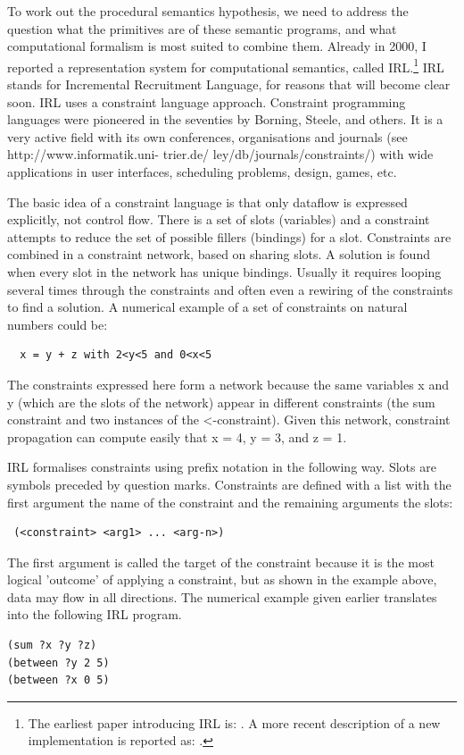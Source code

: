 To work out the procedural semantics hypothesis, we need to address the question what the primitives are of 
these semantic programs, and what computational formalism is most suited to combine them. Already in 2000, I reported
a representation system for computational semantics, called IRL.\footnote{
The earliest paper introducing IRL is: \cite{Steels:2000}. 
A more recent description of a new implementation is reported as: \cite{Spranger:2012}.}
IRL stands for Incremental Recruitment Language, for reasons that will become clear soon. 
IRL uses a constraint language approach. Constraint programming languages were pioneered in the  
seventies by Borning, Steele, and others. It is a very active field with its own conferences, 
organisations and journals (see http://www.informatik.uni- trier.de/ ley/db/journals/constraints/) 
with wide applications in user interfaces, scheduling problems, design, games, etc. 

The basic idea of a constraint language is that only dataflow is expressed explicitly, not control flow. 
There is a set of slots (variables) and a constraint attempts to reduce the set of possible 
fillers (bindings) for a slot. Constraints are combined in 
a constraint network, based on sharing slots. A solution is found when every slot in the network has unique bindings. 
Usually it requires looping several times through the constraints and often even a rewiring of the constraints to 
find a solution. A numerical example of a set of constraints on natural numbers could be:
\begin{verbatim}
  x = y + z with 2<y<5 and 0<x<5
\end{verbatim}
The constraints expressed here form a network because the same variables x and y (which are the slots of the 
network) appear in different constraints (the sum constraint and two instances of the <-constraint). 
Given this network, constraint propagation can compute easily that x = 4, y = 3, and z = 1. 

IRL formalises constraints using prefix notation in the following way. Slots are symbols preceded 
by question marks. Constraints are defined with a list with the first argument the name of the constraint and 
the remaining arguments the slots: 
\begin{verbatim}
 (<constraint> <arg1> ... <arg-n>)
\end{verbatim}
The first argument is called the target of the constraint because it is the most logical 'outcome' 
of applying a constraint, but as shown in the example above, data may flow in all directions. The numerical 
example given earlier translates into the following IRL program. 
\begin{verbatim}
(sum ?x ?y ?z)
(between ?y 2 5)
(between ?x 0 5)
\end{verbatim}

